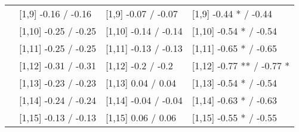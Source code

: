 \begin{table}
\begin{tabular}[t]{llll}
 & {}[1,9] -0.16  / -0.16 & {}[1,9] -0.07  / -0.07 & {}[1,9] -0.44 * / -0.44\\
 & {}[1,10] -0.25  / -0.25 & {}[1,10] -0.14  / -0.14 & {}[1,10] -0.54 * / -0.54\\
 & {}[1,11] -0.25  / -0.25 & {}[1,11] -0.13  / -0.13 & {}[1,11] -0.65 * / -0.65\\
 & {}[1,12] -0.31  / -0.31 & {}[1,12] -0.2  / -0.2 & {}[1,12] -0.77 ** / -0.77 *\\
\addlinespace
 & {}[1,13] -0.23  / -0.23 & {}[1,13] 0.04  / 0.04 & {}[1,13] -0.54 * / -0.54\\
 & {}[1,14] -0.24  / -0.24 & {}[1,14] -0.04  / -0.04 & {}[1,14] -0.63 * / -0.63\\
 & {}[1,15] -0.13  / -0.13 & {}[1,15] 0.06  / 0.06 & {}[1,15] -0.55 * / -0.55\\
\bottomrule
\end{tabular}
\end{table}
